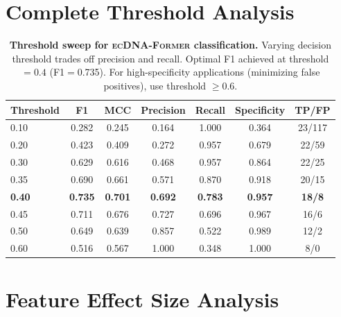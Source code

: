 \documentclass[sigconf,anonymous]{acmart}
\newcommand{\former}{\textsc{ecDNA-Former}}
\begin{document}
\section{Complete Threshold Analysis}
\label{app:threshold}

\begin{table}[h]
\caption{\textbf{Threshold sweep for \former{} classification.} Varying decision threshold trades off precision and recall. Optimal F1 achieved at threshold $=0.4$ (F1$=$0.735). For high-specificity applications (minimizing false positives), use threshold $\geq 0.6$.}
\label{tab:threshold_app}
\centering
\small
\begin{tabular}{@{}lcccccc@{}}
\toprule
Threshold & F1 & MCC & Precision & Recall & Specificity & TP/FP \\
\midrule
0.10 & 0.282 & 0.245 & 0.164 & 1.000 & 0.364 & 23/117 \\
0.20 & 0.423 & 0.409 & 0.272 & 0.957 & 0.679 & 22/59 \\
0.30 & 0.629 & 0.616 & 0.468 & 0.957 & 0.864 & 22/25 \\
0.35 & 0.690 & 0.661 & 0.571 & 0.870 & 0.918 & 20/15 \\
\textbf{0.40} & \textbf{0.735} & \textbf{0.701} & \textbf{0.692} & \textbf{0.783} & \textbf{0.957} & \textbf{18/8} \\
0.45 & 0.711 & 0.676 & 0.727 & 0.696 & 0.967 & 16/6 \\
0.50 & 0.649 & 0.639 & 0.857 & 0.522 & 0.989 & 12/2 \\
0.60 & 0.516 & 0.567 & 1.000 & 0.348 & 1.000 & 8/0 \\
\bottomrule
\end{tabular}
\end{table}


\section{Feature Effect Size Analysis}
\label{app:features_effects}
\end{document}

